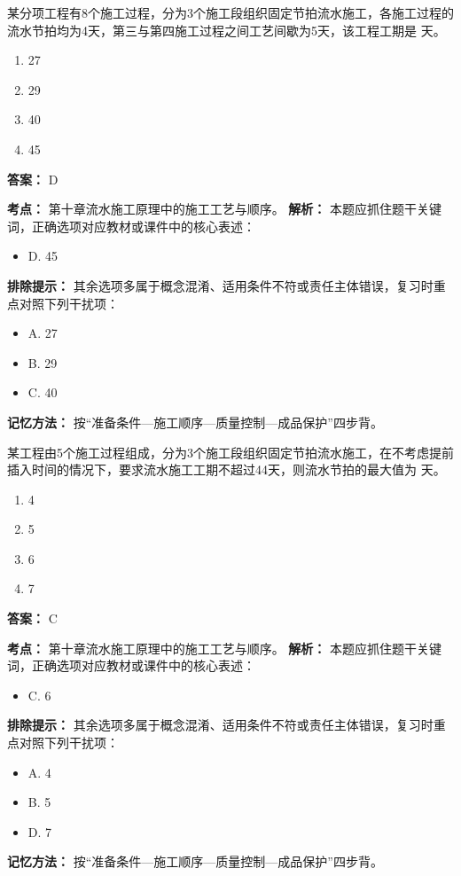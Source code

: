 \documentclass[UTF8,fontset=fandol,11pt]{ctexart}
\begin{document}
\begin{quizbox}[title={第 11 题}]
某分项工程有8个施工过程，分为3个施工段组织固定节拍流水施工，各施工过程的流水节拍均为4天，第三与第四施工过程之间工艺间歇为5天，该工程工期是 天。\\
\begin{enumerate}[label=\Alph*.]
\item 27
\item 29
\item 40
\item 45
\end{enumerate}
\textbf{答案：} D
\vspace{0.25em}
\begin{answerbox}[title={考点解析}]
\textbf{考点：} 第十章流水施工原理中的施工工艺与顺序。
\textbf{解析：} 本题应抓住题干关键词，正确选项对应教材或课件中的核心表述：
\begin{itemize}
\item D. 45
\end{itemize}
\textbf{排除提示：} 其余选项多属于概念混淆、适用条件不符或责任主体错误，复习时重点对照下列干扰项：
\begin{itemize}
\item A. 27
\item B. 29
\item C. 40
\end{itemize}
\textbf{记忆方法：} 按“准备条件—施工顺序—质量控制—成品保护”四步背。
\end{answerbox}
\end{quizbox}

\begin{quizbox}[title={第 12 题}]
某工程由5个施工过程组成，分为3个施工段组织固定节拍流水施工，在不考虑提前插入时间的情况下，要求流水施工工期不超过44天，则流水节拍的最大值为 天。\\
\begin{enumerate}[label=\Alph*.]
\item 4
\item 5
\item 6
\item 7
\end{enumerate}
\textbf{答案：} C
\vspace{0.25em}
\begin{answerbox}[title={考点解析}]
\textbf{考点：} 第十章流水施工原理中的施工工艺与顺序。
\textbf{解析：} 本题应抓住题干关键词，正确选项对应教材或课件中的核心表述：
\begin{itemize}
\item C. 6
\end{itemize}
\textbf{排除提示：} 其余选项多属于概念混淆、适用条件不符或责任主体错误，复习时重点对照下列干扰项：
\begin{itemize}
\item A. 4
\item B. 5
\item D. 7
\end{itemize}
\textbf{记忆方法：} 按“准备条件—施工顺序—质量控制—成品保护”四步背。
\end{answerbox}
\end{quizbox}
\end{document}

